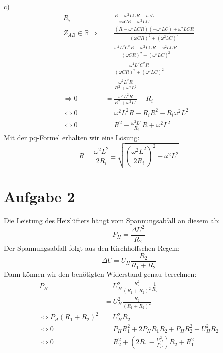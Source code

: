 \documentclass[11pt a4paper]{article}
\begin{document}
\newpage
\setlength{\headheight}{0cm}

c) 
\begin{align*}
	R_i
	&= \frac{R - \omega^2 LCR + i \omega L}{i\omega CR - \omega^2 LC} \\
	Z_{AB} \in \mathbb{R} \Rightarrow
	&= \frac{(R - \omega^2 LCR) (-\omega^2 LC) + \omega^2 LCR}{(\omega CR)^2 + (\omega^2 LC)^2} \\
	&= \frac{\omega^4 L^2 C^2 R - \omega^2 LCR + \omega^2 LCR}{(\omega CR)^2 + (\omega^2 LC)^2} \\
	&= \frac{\omega^4 L^2 C^2 R}{(\omega CR)^2 + (\omega^2 LC)^2} \\
	&= \frac{\omega^2 L^2 R}{R^2 + \omega^2 L^2} \\
	\Rightarrow
	0
	&= \frac{\omega^2 L^2 R}{R^2 + \omega^2 L^2} - R_i \\
	\Leftrightarrow
	0
	&= \omega^2 L^2 R - R_iR^2 - R_i\omega^2L^2 \\
	\Leftrightarrow
	0
	&= R^2 - \frac{\omega^2L^2}{R_i} R + \omega^2 L^2
\end{align*}
Mit der pq-Formel erhalten wir eine Lösung:
\[
	R = \frac{\omega^2L^2}{2 R_i} \pm \sqrt{\left( \frac{\omega^2L^2}{2 R_i}\right)^2 - \omega^2 L^2} 
\]


\newpage
\setlength{\headheight}{0cm}

\section*{Aufgabe 2}
Die Leistung des Heizlüfters hängt vom Spannungsabfall an diesem ab:
\[ P_H = \frac{\Delta U^2}{R_2} \]
Der Spannungsabfall folgt aus den Kirchhoffschen Regeln:
\[ \Delta U = U_H \frac{R_2}{R_1 + R_2} \]
Dann können wir den benötigten Widerstand genau berechnen:
\begin{align*}
	P_H 
	&= U_H^2 \frac{R_2^2}{(R_1 + R_2)^2} \frac{1}{R_2} \\
	&= U_H^2 \frac{R_2}{(R_1 + R_2)^2} \\
	\Leftrightarrow
	P_H (R_1 + R_2)^2 
	&= U_H^2 R_2 \\
	\Leftrightarrow
	0 
	&= P_H R_1^2 + 2 P_H R_1 R_2 + P_H R_2^2 - U_H^2 R_2 \\
	\Leftrightarrow
	0
	&= R_2^2 + \left( 2 R_1 - \frac{U_H^2}{P_H} \right) R_2 + R_1^2 \\
\end{align*}
\end{document}
